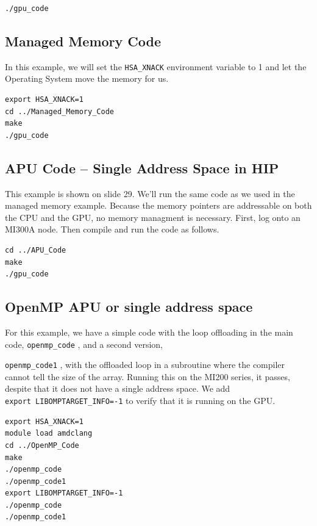 \documentclass[
]{article}
\let\oldtexttt\texttt
\renewcommand{\texttt}[1]{
  \colorbox{Light}{\oldtexttt{#1}}
}
\begin{document}
\begin{verbatim}
./gpu_code
\end{verbatim}

\hypertarget{managed-memory-code}{%
\subsection{Managed Memory Code}\label{managed-memory-code}}

In this example, we will set the \texttt{HSA\_XNACK} environment
variable to 1 and let the Operating System move the memory for us.

\begin{verbatim}
export HSA_XNACK=1
cd ../Managed_Memory_Code
make
./gpu_code
\end{verbatim}

\hypertarget{apu-code-single-address-space-in-hip}{%
\subsection{APU Code -- Single Address Space in
HIP}\label{apu-code-single-address-space-in-hip}}

This example is shown on slide 29. We'll run the same code as we used in
the managed memory example. Because the memory pointers are addressable
on both the CPU and the GPU, no memory managment is necessary. First,
log onto an MI300A node. Then compile and run the code as follows.

\begin{verbatim}
cd ../APU_Code
make
./gpu_code
\end{verbatim}

\hypertarget{openmp-apu-or-single-address-space}{%
\subsection{OpenMP APU or single address
space}\label{openmp-apu-or-single-address-space}}

For this example, we have a simple code with the loop offloading in the
main code, \texttt{openmp\_code}, and a second version,
\texttt{openmp\_code1}, with the offloaded loop in a subroutine where
the compiler cannot tell the size of the array. Running this on the
MI200 series, it passes, despite that it does not have a single address
space. We add \texttt{export\ LIBOMPTARGET\_INFO=-1} to verify that it
is running on the GPU.

\begin{verbatim}
export HSA_XNACK=1
module load amdclang
cd ../OpenMP_Code
make
./openmp_code
./openmp_code1
export LIBOMPTARGET_INFO=-1
./openmp_code
./openmp_code1
\end{verbatim}
\end{document}
